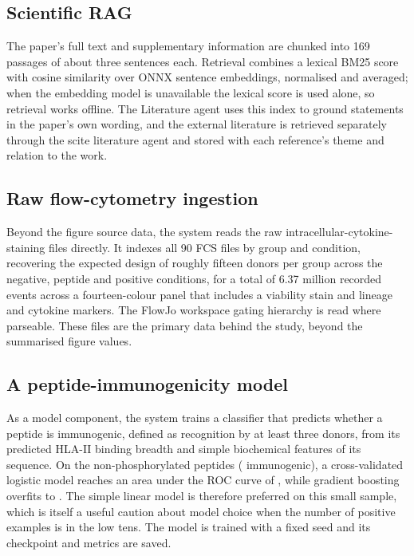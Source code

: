 \documentclass[11pt]{article}
\begin{document}
\begin{table}[t]
\centering
\caption{The sixteen tools exposed by the MCP server and used by the agents.}
\label{tab:tools}
\footnotesize

\end{table}

\subsection{Scientific RAG}
The paper's full text and supplementary information are chunked into 169 passages of about three
sentences each. Retrieval combines a lexical BM25 score with cosine similarity over ONNX sentence
embeddings, normalised and averaged; when the embedding model is unavailable the lexical score is
used alone, so retrieval works offline. The Literature agent uses this index to ground statements
in the paper's own wording, and the external literature is retrieved separately through the scite
literature agent and stored with each reference's theme and relation to the work.

\subsection{Raw flow-cytometry ingestion}
Beyond the figure source data, the system reads the raw intracellular-cytokine-staining files
directly. It indexes all 90 FCS files by group and condition, recovering the expected design of
roughly fifteen donors per group across the negative, peptide and positive conditions, for a total
of 6.37 million recorded events across a fourteen-colour panel that includes a viability stain and
lineage and cytokine markers. The FlowJo workspace gating hierarchy is read where parseable. These
files are the primary data behind the study, beyond the summarised figure values.

\subsection{A peptide-immunogenicity model}
As a model component, the system trains a classifier that predicts whether a peptide is immunogenic,
defined as recognition by at least three donors, from its predicted HLA-II binding breadth and
simple biochemical features of its sequence. On the \ModelN{} non-phosphorylated peptides
(\ModelPos{} immunogenic), a cross-validated logistic model reaches an area under the ROC curve of
\ModelBaselineAUC{}, while gradient boosting overfits to \ModelGBAUC{}. The simple linear model is
therefore preferred on this small sample, which is itself a useful caution about model choice when
the number of positive examples is in the low tens. The model is trained with a fixed seed and its
checkpoint and metrics are saved.
\end{document}
